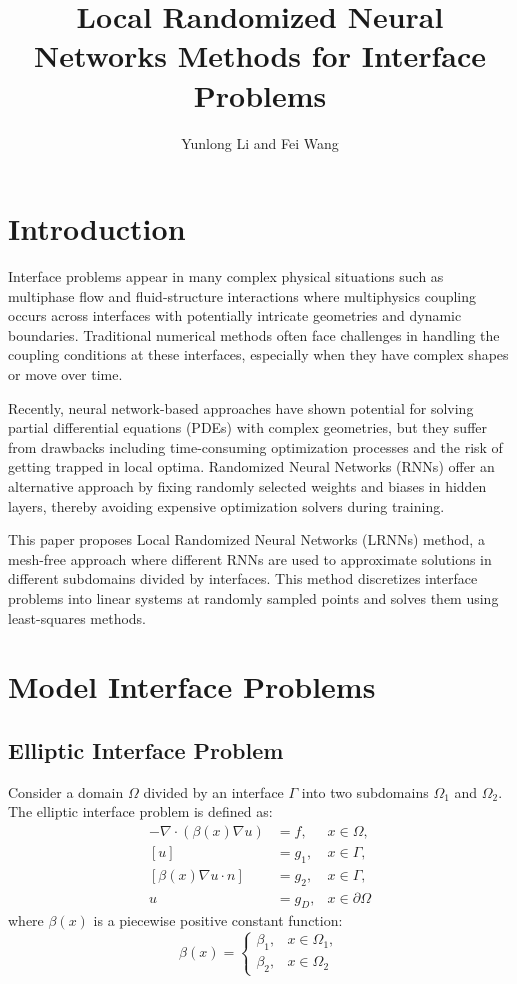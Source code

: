 \documentclass[11pt]{article}
\title{Local Randomized Neural Networks Methods for Interface Problems}
\author{Yunlong Li and Fei Wang}
\date{}
\begin{document}
\maketitle

\section{Introduction}
Interface problems appear in many complex physical situations such as multiphase flow and fluid-structure interactions where multiphysics coupling occurs across interfaces with potentially intricate geometries and dynamic boundaries. Traditional numerical methods often face challenges in handling the coupling conditions at these interfaces, especially when they have complex shapes or move over time.

Recently, neural network-based approaches have shown potential for solving partial differential equations (PDEs) with complex geometries, but they suffer from drawbacks including time-consuming optimization processes and the risk of getting trapped in local optima. Randomized Neural Networks (RNNs) offer an alternative approach by fixing randomly selected weights and biases in hidden layers, thereby avoiding expensive optimization solvers during training.

This paper proposes Local Randomized Neural Networks (LRNNs) method, a mesh-free approach where different RNNs are used to approximate solutions in different subdomains divided by interfaces. This method discretizes interface problems into linear systems at randomly sampled points and solves them using least-squares methods.

\section{Model Interface Problems}

\subsection{Elliptic Interface Problem}
Consider a domain $\Omega$ divided by an interface $\Gamma$ into two subdomains $\Omega_1$ and $\Omega_2$. The elliptic interface problem is defined as:
\begin{align}
-\nabla \cdot (\beta(x)\nabla u) &= f, &x \in \Omega, \\
[u] &= g_1, &x \in \Gamma, \\
[\beta(x)\nabla u \cdot n] &= g_2, &x \in \Gamma, \\
u &= g_D, &x \in \partial\Omega
\end{align}
where $\beta(x)$ is a piecewise positive constant function:
\begin{equation}
\beta(x) = 
\begin{cases}
\beta_1, & x \in \Omega_1, \\
\beta_2, & x \in \Omega_2
\end{cases}
\end{equation}
\end{document}
